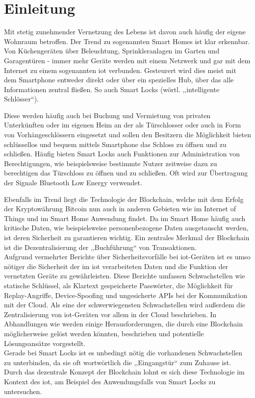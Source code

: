 \section{Einleitung}
\label{sec:intro}
    Mit stetig zunehmender Vernetzung des Lebens ist davon auch häufig der eigene Wohnraum betroffen. 
    Der Trend zu sogenannten Smart Homes ist klar erkennbar\cite{Paley2018}. 
    Von Küchengeräten über Beleuchtung, Sprinkleranlagen im Garten und Ga\-ra\-gen\-tü\-ren - immer mehr Geräte werden mit einem Netzwerk und gar mit dem Internet zu einem sogenannten \gls{iot} verbunden. 
    Gesteurert wird dies meist mit dem Smartphone entweder direkt oder über ein spezielles Hub, über das alle Informationen zentral fließen.
    So auch Smart Locks (wörtl. ,,intelligente Schlösser``).

    Diese werden häufig auch bei Buchung und Vermietung von privaten Unterkünften oder im eigenen Heim an der als Türschlosser oder auch in Form von Vorhängeschlössern eingesetzt und sollen den Besitzern die Möglichkeit bieten schlüssellos und bequem mittels Smartphone das Schloss zu öffnen und zu schließen.
    Häufig bieten Smart Locks auch Funktionen zur Administration von Berechtigungen, wie beispielsweise bestimmte Nutzer zeitweise dazu zu berechtigen das Türschloss zu öffnen und zu schließen.
    Oft wird zur Übertragung der Signale Bluetooth Low Energy verwendet.
    
    Ebenfalls im Trend liegt die Technologie der Blockchain, welche mit dem Erfolg der Kryptowährung Bitcoin nun auch in anderen Gebieten wie im Internet of Things und im Smart Home Anwendung findet.
    Da im Smart Home häufig auch kritische Daten, wie beispielsweise personenbezogene Daten ausgetauscht werden, ist deren Sicherheit zu garantieren wichtig.
    Ein zentrales Merkmal der Blockchain ist die Dezentralisierung der ,,Buchführung`` von Transaktionen.
    \medskip\\
    Aufgrund vermehrter Berichte über Sicherheitsvorfälle bei \gls{iot}-Geräten ist es umso nötiger die Sicherheit der im \gls{iot} verarbeiteten Daten und die Funktion der vernetzten Geräte zu gewährleisten.
    Diese Berichte umfassen Schwachstellen wie statische Schlüssel, als Klartext gespeicherte Passwörter, die Möglichkeit für Replay-Angriffe, Device-Spoofing\cite{Rose2016} und ungesicherte APIs bei der Kommunikation mit der Cloud\cite{Stykas2018}. 
    Als eine der schwerwiegensten Schwachstellen wird außerdem die Zentralisierung von \gls{iot}-Geräten vor allem in der Cloud beschrieben\cite{Kshetri2017}.
    In Abhandlungen wie \cite{Kshetri2017} werden einige Herausforderungen, die durch eine Blockchain möglicherweise gelöst werden könnten, beschrieben und potentielle Lösungsansätze vorgestellt.\\
    Gerade bei Smart Locks ist es unbedingt nötig die vorhandenen Schwachstellen zu unterbinden, da sie oft wortwörtlich die ,,Eingangstür`` zum Zuhause ist.
    Durch das dezentrale Konzept der Blockchain\cite{Nakamoto2008} lohnt es sich diese Technologie im Kontext des \gls{iot}, am Beispiel des Anwendungsfalls von Smart Locks zu untersuchen.
    

